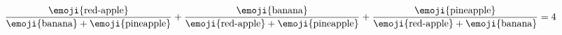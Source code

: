 \documentclass[t]{ctexbeamer}
\begin{document}
\begin{frame}
  \begin{preview}
    $\displaystyle \frac{\text{\emoji{red-apple}}}{\text{\emoji{banana}} + \text{\emoji{pineapple}}} + \frac{\text{\emoji{banana}}}{\text{\emoji{red-apple}} + \text{\emoji{pineapple}}} + \frac{\text{\emoji{pineapple}}}{\text{\emoji{red-apple}} + \text{\emoji{banana}}} = 4$
  \end{preview}
\end{frame}
\end{document}
